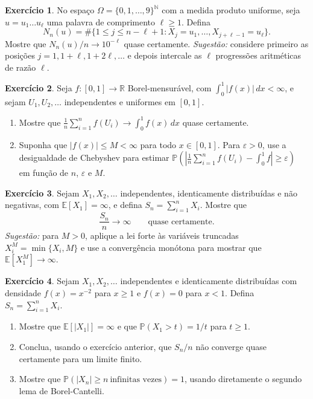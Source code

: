 \documentclass[12pt,portuguese]{article}
\theoremstyle{definition}
\theoremstyle{plainexercise}
\newtheorem{exercise}{Exercício}
\theoremstyle{starredexercise}
\theoremstyle{definition}
\begin{document}
\begin{exercise}\label{exercise:palavras}
No espaço $\Omega=\{0,1,\ldots,9\}^{\mathbb{N}}$ com a medida produto uniforme,
seja $u=u_1\ldots u_\ell$ uma palavra de comprimento $\ell\geqslant1$. Defina
\[
N_n(u)=\#\{1\leqslant j\leqslant n-\ell+1:X_j=u_1,\ldots,X_{j+\ell-1}=u_\ell\}.
\]
Mostre que $N_n(u)/n\to10^{-\ell}$ quase certamente. \emph{Sugestão:} considere
primeiro as posições $j=1,1+\ell,1+2\ell,\ldots$ e depois intercale as $\ell$
progressões aritméticas de razão $\ell$.
\end{exercise}

\begin{exercise}\label{exercise:monte-carlo}
Seja $f:[0,1]\to\mathbb{R}$ Borel-mensurável, com
$\int_0^1|f(x)|\,dx<\infty$, e sejam $U_1,U_2,\ldots$ independentes
e uniformes em $[0,1]$.
\begin{enumerate}
\item[(a)] Mostre que
$\frac{1}{n}\sum_{i=1}^{n}f(U_i)\to\int_0^1f(x)\,dx$ quase certamente.
\item[(b)] Suponha que $|f(x)|\leqslant M<\infty$ para todo $x\in[0,1]$.
Para $\varepsilon>0$, use a desigualdade de Chebyshev para estimar
$\mathbb{P}(|\frac{1}{n}\sum_{i=1}^{n}f(U_i)-\int_0^1f|\geqslant\varepsilon)$
em função de $n$, $\varepsilon$ e $M$.
\end{enumerate}
\end{exercise}

\begin{exercise}\label{exercise:media-infinita}
Sejam $X_1,X_2,\ldots$ independentes, identicamente distribuídas e não
negativas, com $\mathbb{E}[X_1]=\infty$, e defina
$S_n=\sum_{i=1}^{n}X_i$. Mostre que
\[
\frac{S_n}{n}\longrightarrow\infty
\qquad\text{quase certamente.}
\]
\emph{Sugestão:} para $M>0$, aplique a lei forte às variáveis truncadas
$X_i^M=\min\{X_i,M\}$ e use a convergência monótona para mostrar que
$\mathbb{E}[X_1^M]\to\infty$.
\end{exercise}

\begin{exercise}\label{exercise:pareto}
Sejam $X_1,X_2,\ldots$ independentes e identicamente distribuídas com
densidade $f(x)=x^{-2}$ para $x\geqslant1$ e $f(x)=0$ para $x<1$. Defina
$S_n=\sum_{i=1}^{n}X_i$.
\begin{enumerate}
\item[(a)] Mostre que $\mathbb{E}[|X_1|]=\infty$ e que
$\mathbb{P}(X_1>t)=1/t$ para $t\geqslant1$.
\item[(b)] Conclua, usando o exercício anterior, que $S_n/n$ não converge quase
certamente para um limite finito.
\item[(c)] Mostre que $\mathbb{P}(|X_n|\geqslant n\ \text{infinitas vezes})=1$,
usando diretamente o segundo lema de Borel-Cantelli.
\end{enumerate}
\end{exercise}
\end{document}
